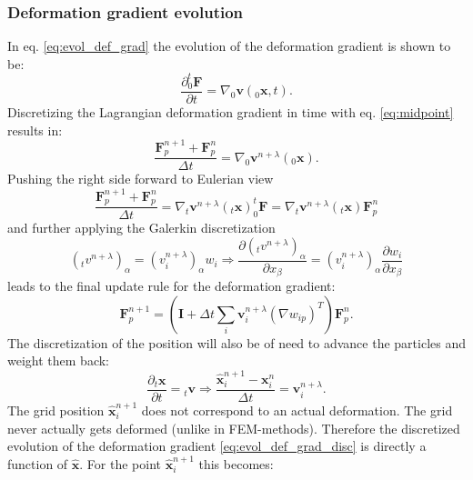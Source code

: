 \documentclass[m,times]{cgMA}
\begin{document}
\subsubsection{Deformation gradient evolution}
In eq. \ref{eq:evol_def_grad} the evolution of the deformation gradient is shown to be:
\begin{equation}
  \frac{\partial ^t_0\boldsymbol{F}}{\partial t} =  \nabla{_0\boldsymbol{v}}(_0\boldsymbol{x},t).
\end{equation}
Discretizing the Lagrangian deformation gradient in time with eq. \ref{eq:midpoint} results in:
\begin{equation}
  \frac{\boldsymbol{F}^{n+1}_p + \boldsymbol{F}^{n}_p}{\Delta t} =  \nabla_0\boldsymbol{v}^{n+\lambda}(_0\boldsymbol{x}).
\end{equation}
Pushing the right side forward to Eulerian view
\begin{equation}
  \frac{\boldsymbol{F}^{n+1}_p + \boldsymbol{F}^{n}_p}{\Delta t} =  \nabla_t\boldsymbol{v}^{n+\lambda}(_t\boldsymbol{x})^t_0\boldsymbol{F} = \nabla_t\boldsymbol{v}^{n+\lambda}(_t\boldsymbol{x})\boldsymbol{F}^n_p
\end{equation}
and further applying the Galerkin discretization
\begin{equation}
  (_tv^{n+\lambda})_\alpha = (v_{i}^{n+\lambda})_\alpha w_i \Rightarrow \frac{\partial (_tv^{n+\lambda})_\alpha}{\partial x_\beta} =(v_i^{n+\lambda})_\alpha\frac{\partial w_i}{\partial x_\beta}
\end{equation}
leads to the final update rule for the deformation gradient:
\begin{equation}\label{eq:evol_def_grad_disc}
\boldsymbol{F}^{n+1}_p = \left( \boldsymbol{I} + \Delta t\sum_i \boldsymbol{v}_i^{n+\lambda}({\nabla w_{ip}})^T \right)\boldsymbol{F}^{n}_p.
\end{equation}
The discretization of the position will also be of need to advance the particles and weight them back:
\begin{equation}  \frac{\partial _t\boldsymbol{x}}{\partial t} = {_t\boldsymbol{v}} \Rightarrow \frac{\boldsymbol{\hat{x}}_i^{n+1}
  - \boldsymbol{x}_i^{n}}{\Delta t} = \boldsymbol{v}_i^{n+\lambda}.
\end{equation}
The grid position $\boldsymbol{\hat{x}}_i^{n+1}$ does not correspond to an actual deformation. The grid never actually gets deformed (unlike in FEM-methods). Therefore the discretized evolution of the deformation gradient  \ref{eq:evol_def_grad_disc} is directly a function of $\boldsymbol{\hat{x}}$. For the point $\boldsymbol{\hat{x}}_i^{n+1}$ this becomes:
\end{document}
